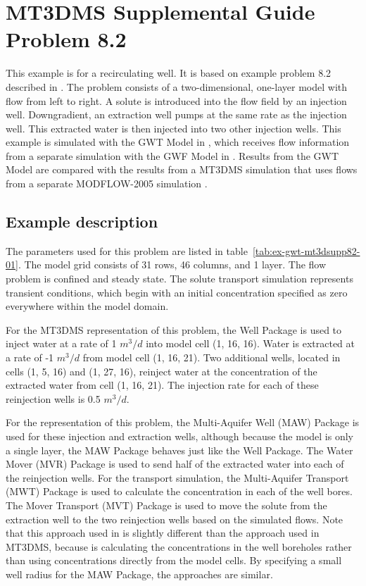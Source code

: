\section{MT3DMS Supplemental Guide Problem 8.2}

This example is for a recirculating well.  It is based on example problem 8.2 described in \cite{zheng2010mt3dmsv5.3}.  The problem consists of a two-dimensional, one-layer model with flow from left to right.  A solute is introduced into the flow field by an injection well.  Downgradient, an extraction well pumps at the same rate as the injection well.  This extracted water is then injected into two other injection wells.  This example is simulated with the GWT Model in \mf, which receives flow information from a separate simulation with the GWF Model in \mf.  Results from the GWT Model are compared with the results from a MT3DMS simulation \citep{zheng1990mt3d} that uses flows from a separate MODFLOW-2005 simulation \citep{modflow2005}.  

\subsection{Example description}

The parameters used for this problem are listed in table~\ref{tab:ex-gwt-mt3dsupp82-01}.  The model grid consists of 31 rows, 46 columns, and 1 layer.  The flow problem is confined and steady state.  The solute transport simulation represents transient conditions, which begin with an initial concentration specified as zero everywhere within the model domain.

For the MT3DMS representation of this problem, the Well Package is used to inject water at a rate of 1 $m^3/d$ into model cell (1, 16, 16).  Water is extracted at a rate of -1 $m^3/d$ from model cell (1, 16, 21).  Two additional wells, located in cells (1, 5, 16) and (1, 27, 16), reinject water at the concentration of the extracted water from cell (1, 16, 21).  The injection rate for each of these reinjection wells is 0.5 $m^3/d$.

For the \mf representation of this problem, the Multi-Aquifer Well (MAW) Package is used for these injection and extraction wells, although because the model is only a single layer, the MAW Package behaves just like the Well Package.  The Water Mover (MVR) Package is used to send half of the extracted water into each of the reinjection wells.  For the \mf transport simulation, the Multi-Aquifer Transport (MWT) Package is used to calculate the concentration in each of the well bores.  The Mover Transport (MVT) Package is used to move the solute from the extraction well to the two reinjection wells based on the simulated flows.  Note that this approach used in \mf is slightly different than the approach used in MT3DMS, because \mf is calculating the concentrations in the well boreholes rather than using concentrations directly from the model cells.  By specifying a small well radius for the MAW Package, the approaches are similar.

